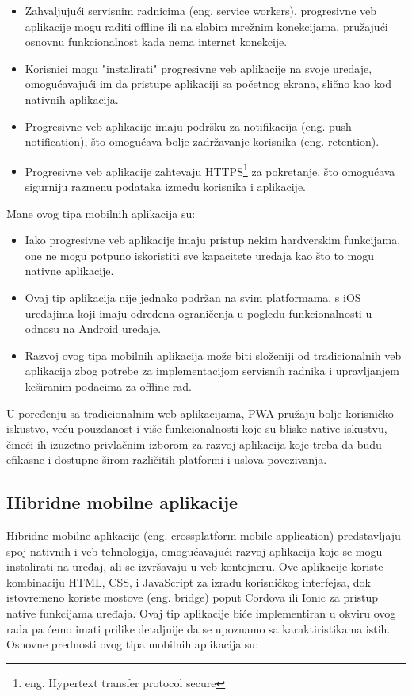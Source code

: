 \documentclass[12pt,oneside]{memoir}
\begin{document}
\begin{itemize}
    \item Zahvaljujući servisnim radnicima (eng. service workers), progresivne veb aplikacije mogu raditi offline ili na slabim mrežnim konekcijama, pružajući osnovnu funkcionalnost kada nema internet konekcije.
    \item Korisnici mogu "instalirati" progresivne veb aplikacije na svoje uređaje, omogućavajući im da pristupe aplikaciji sa početnog ekrana, slično kao kod nativnih aplikacija.
    \item Progresivne veb aplikacije imaju podršku za notifikacija (eng. push notification), što omogućava bolje zadržavanje korisnika (eng. retention).
    \item Progresivne veb aplikacije zahtevaju HTTPS\footnote{eng. Hypertext transfer protocol secure} za pokretanje, što omogućava sigurniju razmenu podataka između korisnika i aplikacije.
\end{itemize}
Mane ovog tipa mobilnih aplikacija su:
\begin{itemize}
    \item Iako progresivne veb aplikacije imaju pristup nekim hardverskim funkcijama, one ne mogu potpuno iskoristiti sve kapacitete uređaja kao što to mogu nativne aplikacije.
    \item Ovaj tip aplikacija nije jednako podržan na svim platformama, s iOS uređajima koji imaju određena ograničenja u pogledu funkcionalnosti u odnosu na Android uređaje.
    \item Razvoj ovog tipa mobilnih aplikacija može biti složeniji od tradicionalnih veb aplikacija zbog potrebe za implementacijom servisnih radnika i upravljanjem keširanim podacima za offline rad.
\end{itemize}

U poređenju sa tradicionalnim web aplikacijama, PWA pružaju bolje korisničko iskustvo, veću pouzdanost i više funkcionalnosti koje su bliske native iskustvu, čineći ih izuzetno privlačnim izborom za razvoj aplikacija koje treba da budu efikasne i dostupne širom različitih platformi i uslova povezivanja.

\subsection{Hibridne mobilne aplikacije}

Hibridne mobilne aplikacije (eng. crossplatform mobile application) predstavljaju spoj nativnih i veb tehnologija, omogućavajući razvoj aplikacija koje se mogu instalirati na uređaj, ali se izvršavaju u veb kontejneru. Ove aplikacije koriste kombinaciju HTML, CSS, i JavaScript za izradu korisničkog interfejsa, dok istovremeno koriste mostove (eng. bridge) poput Cordova ili Ionic za pristup native funkcijama uređaja. Ovaj tip aplikacije biće implementiran u okviru ovog rada pa ćemo imati prilike detaljnije da se upoznamo sa karaktiristikama istih. Osnovne prednosti ovog tipa mobilnih aplikacija su:
\end{document}

